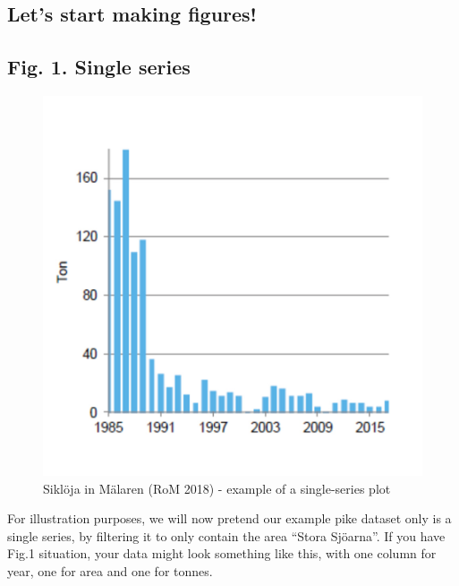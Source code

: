 \documentclass[]{article}
\newenvironment{Shaded}{\begin{snugshade}}{\end{snugshade}}
\newcommand{\KeywordTok}[1]{\textcolor[rgb]{0.13,0.29,0.53}{\textbf{#1}}}
\newcommand{\StringTok}[1]{\textcolor[rgb]{0.31,0.60,0.02}{#1}}
\newcommand{\OperatorTok}[1]{\textcolor[rgb]{0.81,0.36,0.00}{\textbf{#1}}}
\newcommand{\NormalTok}[1]{#1}
\begin{document}
\subsection{Let's start making
figures!}\label{lets-start-making-figures}

\subsection{Fig. 1. Single series}\label{fig.-1.-single-series}

\begin{figure}

{\centering \includegraphics{sikloja} 

}

\caption{Siklöja in Mälaren (RoM 2018) - example of a single-series plot}\label{fig:unnamed-chunk-11}
\end{figure}

For illustration purposes, we will now pretend our example pike dataset
only is a single series, by filtering it to only contain the area
``Stora Sjöarna''. If you have Fig.1 situation, your data might look
something like this, with one column for year, one for area and one for
tonnes.

\begin{Shaded}
\end{Shaded}
\end{document}
